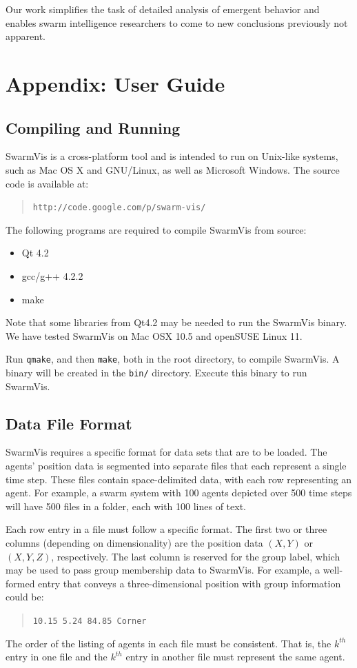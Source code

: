 \documentclass{vgtc}
\begin{document}
Our work simplifies the task of detailed analysis of emergent behavior and
enables swarm intelligence researchers to come to new conclusions previously not apparent.




\vspace{50pt}




\section{Appendix: User Guide}

\subsection{Compiling and Running}
SwarmVis is a cross-platform tool
and is intended to run on Unix-like systems, such as Mac OS X and GNU/Linux, as well as Microsoft Windows.
The source code is available at:\begin{quote}\texttt{http://code.google.com/p/swarm-vis/}\end{quote}
The following programs are required to compile SwarmVis from source:
\begin{itemize}
\item Qt 4.2
\item gcc/g++ 4.2.2
\item make
\end{itemize}
Note that some libraries from Qt4.2 may be needed to run the SwarmVis binary.
We have tested SwarmVis on Mac OSX 10.5 and openSUSE Linux 11.

Run \texttt{qmake}, and then \texttt{make}, both in the root directory, to compile SwarmVis.
A binary will be created in the \texttt{bin/} directory. Execute this binary to run SwarmVis.

\subsection{Data File Format}
SwarmVis requires a specific format for data sets that are to be loaded. The agents' position data is segmented into
separate files that each represent a single time step. These files contain space-delimited data, with
each row representing an agent. For example, a swarm system with 100 agents depicted over 500 time steps
will have 500 files in a folder, each with 100 lines of text.

Each row entry in a file must follow a specific format. The first two or three  columns (depending on dimensionality) are the
position data $(X, Y)$ or $(X, Y, Z)$, respectively. The last column is reserved for the group label, which may be used to pass
group membership data to SwarmVis.
For example, a well-formed entry that conveys a three-dimensional position with group information could be:
\begin{quote}
\texttt{10.15 5.24 84.85 Corner}
\end{quote}
The order of the listing of agents in each file must be consistent.
That is, the $k^{th}$ entry in one file and the $k^{th}$ entry in another file must represent the same agent.
\end{document}
